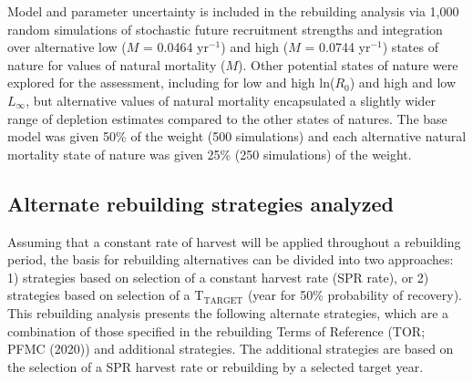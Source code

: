 \documentclass[11pt,
  english,
  letterpaper,
]{article}
\begin{document}
\leavevmode\tagmcend\tagstructend


Model and parameter uncertainty is included in the rebuilding analysis via 1,000 random simulations of stochastic future recruitment strengths and integration over alternative low ({\(M\)\leavevmode\tagmcend\tagstructend} = 0.0464 yr{\(^{-1}\)\leavevmode\tagmcend\tagstructend}) and high ({\(M\)\leavevmode\tagmcend\tagstructend} = 0.0744 yr{\(^{-1}\)\leavevmode\tagmcend\tagstructend}) states of nature for values of natural mortality ({\(M\)\leavevmode\tagmcend\tagstructend}). Other potential states of nature were explored for the assessment, including for low and high ln({\(R_0\)\leavevmode\tagmcend\tagstructend}) and high and low {\(L_{\infty}\)\leavevmode\tagmcend\tagstructend}, but alternative values of natural mortality encapsulated a slightly wider range of depletion estimates compared to the other states of natures. The base model was given 50\% of the weight (500 simulations) and each alternative natural mortality state of nature was given 25\% (250 simulations) of the weight.

\leavevmode\tagmcend\tagstructend\par


\hypertarget{alternate-rebuilding-strategies-analyzed}{%
\subsection{Alternate rebuilding strategies analyzed}\label{alternate-rebuilding-strategies-analyzed}}

\leavevmode\tagmcend\tagstructend


Assuming that a constant rate of harvest will be applied throughout a rebuilding period, the basis for rebuilding alternatives can be divided into two approaches: 1) strategies based on selection of a constant harvest rate (SPR rate), or 2) strategies based on selection of a {\(\text{T}_\text{TARGET}\)\leavevmode\tagmcend\tagstructend} (year for 50\% probability of recovery). This rebuilding analysis presents the following alternate strategies, which are a combination of those specified in the rebuilding Terms of Reference (TOR; PFMC {(2020)\leavevmode\tagmcend\tagstructend}) and additional strategies. The additional strategies are based on the selection of a SPR harvest rate or rebuilding by a selected target year.
\end{document}
